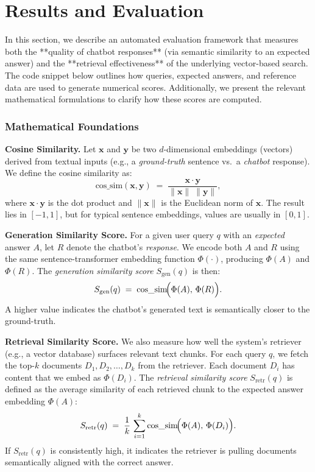 \chapter{Results and Evaluation}
\label{sec:evaluation}

In this section, we describe an automated evaluation framework that measures both the **quality of chatbot responses** (via semantic similarity to an expected answer) and the **retrieval effectiveness** of the underlying vector-based search. The code snippet below outlines how queries, expected answers, and reference data are used to generate numerical scores. Additionally, we present the relevant mathematical formulations to clarify how these scores are computed.

\subsection{Mathematical Foundations}
\label{subsec:math-foundations}

\noindent\textbf{Cosine Similarity.}
Let $\mathbf{x}$ and $\mathbf{y}$ be two $d$-dimensional embeddings (vectors) derived from textual inputs (e.g., a \emph{ground-truth} sentence vs.\ a \emph{chatbot} response). We define the cosine similarity as:
\begin{equation}
  \text{cos\_sim}(\mathbf{x}, \mathbf{y}) \;=\; \frac{\mathbf{x} \cdot \mathbf{y}}{\|\mathbf{x}\|\;\|\mathbf{y}\|},
  \label{eq:cosine-sim}
\end{equation}
where $\mathbf{x} \cdot \mathbf{y}$ is the dot product and $\|\mathbf{x}\|$ is the Euclidean norm of $\mathbf{x}$. The result lies in $[-1, 1]$, but for typical sentence embeddings, values are usually in $[0,1]$.

\noindent\textbf{Generation Similarity Score.}
For a given user query $q$ with an \emph{expected} answer $A$, let $R$ denote the chatbot’s \emph{response}. We encode both $A$ and $R$ using the same sentence-transformer embedding function $\Phi(\cdot)$, producing $\Phi(A)$ and $\Phi(R)$. The \emph{generation similarity score} $S_\text{gen}(q)$ is then:
\begin{equation}
  S_\text{gen}(q) \;=\; \text{cos\_sim}\!\Bigl(\Phi(A),\, \Phi(R)\Bigr).
  \label{eq:generation-sim}
\end{equation}
A higher value indicates the chatbot’s generated text is semantically closer to the ground-truth.

\noindent\textbf{Retrieval Similarity Score.}
We also measure how well the system’s retriever (e.g., a vector database) surfaces relevant text chunks. For each query $q$, we fetch the top-$k$ documents $D_1, D_2, \ldots, D_k$ from the retriever. Each document $D_i$ has content that we embed as $\Phi(D_i)$. The \emph{retrieval similarity score} $S_\text{retr}(q)$ is defined as the average similarity of each retrieved chunk to the expected answer embedding $\Phi(A)$:
\begin{equation}
  S_\text{retr}(q) \;=\; \frac{1}{k}\,\sum_{i=1}^{k} \text{cos\_sim}\!\Bigl(\Phi(A),\, \Phi(D_i)\Bigr).
  \label{eq:retrieval-sim}
\end{equation}
If $S_\text{retr}(q)$ is consistently high, it indicates the retriever is pulling documents semantically aligned with the correct answer.


